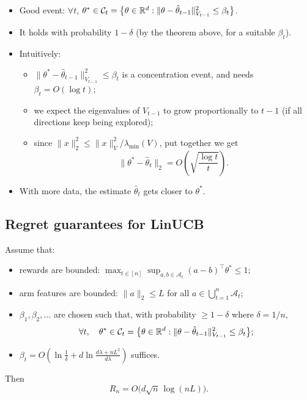 \begin{itemize}
    \item Good event: $\forall t$, $\theta^* \in \mathcal{C}_t = \big\{\theta \in \mathbb{R}^d : \|\theta - \hat{\theta}_{t-1}\|_{V_{t-1}}^2 \leq \beta_t\big\}$.
    \item It holds with probability $1 - \delta$ (by the theorem above, for a suitable $\beta_t$).
    \item Intuitively:
    \begin{itemize}
        \item $\|\theta^* - \hat{\theta}_{t-1}\|_{V_{t-1}}^2 \leq \beta_t$ is a concentration event, and needs $\beta_t = O(\log t)$;
        \item we expect the eigenvalues of $V_{t-1}$ to grow proportionally to $t-1$ (if all directions keep being explored);
        \item since $\|x\|_2^2 \leq \|x\|_V^2/\lambda_{\min}(V)$, put together we get
        \[
        \big\|\theta^* - \hat{\theta}_t\big\|_2 = O\left(\sqrt{\frac{\log t}{t}}\right).
        \]
    \end{itemize}
    \item With more data, the estimate $\hat{\theta}_t$ gets closer to $\theta^*$.
\end{itemize}

\subsection{Regret guarantees for LinUCB}

\begin{theorem}
Assume that:
\begin{itemize}
    \item rewards are bounded: $\max_{t\in[n]}\sup_{a,b\in\mathcal{A}_t} (a - b)^\top\theta^* \leq 1$;
    \item arm features are bounded: $\|a\|_2 \leq L$ for all $a \in \bigcup_{t=1}^n \mathcal{A}_t$;
    \item $\beta_1, \beta_2, \dots$ are chosen such that, with probability $\geq 1-\delta$ where $\delta = 1/n$,
    \[
    \forall t, \quad \theta^* \in \mathcal{C}_t = \big\{\theta\in\mathbb{R}^d : \|\theta - \hat{\theta}_{t-1}\|_{V_{t-1}}^2 \leq \beta_t\big\};
    \]
    \item $\beta_t = O\left(\ln\frac1\delta + d\ln\frac{d\lambda + nL^2}{d\lambda}\right)$ suffices.
\end{itemize}
Then
\[
R_n = O\big(d\sqrt{n}\,\log(nL)\big).
\]
\end{theorem}

